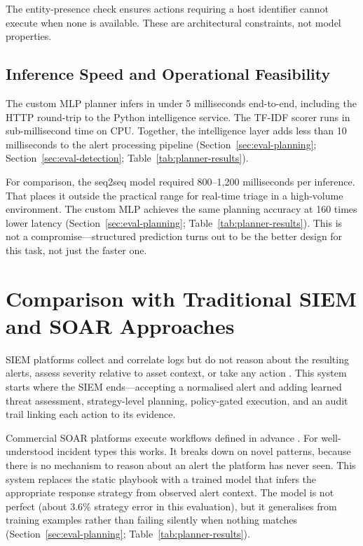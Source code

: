 The entity-presence check ensures actions requiring a host identifier cannot execute when none is available. These are architectural constraints, not model properties.

\subsection{Inference Speed and Operational Feasibility}

The custom MLP planner infers in under 5 milliseconds end-to-end, including the HTTP round-trip to the Python intelligence service. The TF-IDF scorer runs in sub-millisecond time on CPU. Together, the intelligence layer adds less than 10 milliseconds to the alert processing pipeline (Section~\ref{sec:eval-planning}; Section~\ref{sec:eval-detection}; Table~\ref{tab:planner-results}).

For comparison, the seq2seq model required 800--1,200 milliseconds per inference. That places it outside the practical range for real-time triage in a high-volume environment. The custom MLP achieves the same planning accuracy at 160 times lower latency (Section~\ref{sec:eval-planning}; Table~\ref{tab:planner-results}). This is not a compromise---structured prediction turns out to be the better design for this task, not just the faster one.

\section{Comparison with Traditional SIEM and SOAR Approaches}
\label{sec:discussion-comparison}

SIEM platforms collect and correlate logs but do not reason about the resulting alerts, assess severity relative to asset context, or take any action \cite{nist80092, tilbury2024humans}. This system starts where the SIEM ends---accepting a normalised alert and adding learned threat assessment, strategy-level planning, policy-gated execution, and an audit trail linking each action to its evidence.

Commercial SOAR platforms execute workflows defined in advance \cite{nist80061}. For well-understood incident types this works. It breaks down on novel patterns, because there is no mechanism to reason about an alert the platform has never seen. This system replaces the static playbook with a trained model that infers the appropriate response strategy from observed alert context. The model is not perfect (about 3.6\% strategy error in this evaluation), but it generalises from training examples rather than failing silently when nothing matches (Section~\ref{sec:eval-planning}; Table~\ref{tab:planner-results}).


